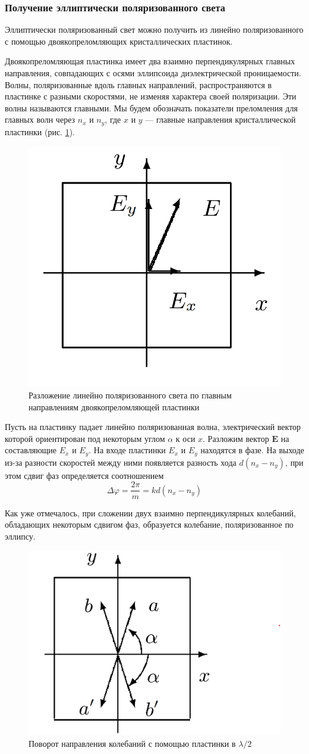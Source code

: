 \subsubsection{Получение эллиптически поляризованного света}

Эллиптически поляризованный свет можно получить из линейно поляризованного с
помощью двоякопреломляющих кристаллических пластинок.

Двоякопреломляющая пластинка имеет два взаимно перпендикулярных главных направления, совпадающих с осями эллипсоида диэлектрической проницаемости. Волны, поляризованные вдоль главных направлений, распространяются в пластинке с разными скоростями, не изменяя характера своей поляризации. Эти волны называются главными. Мы будем обозначать показатели преломления для главных волн через $ n_x $ и $ n_y $, где $ x $ и $ y $ --- главные направления кристаллической пластинки (рис. \ref{pic_1}).
\begin{figure}[!hb]
	\centering
	\includegraphics[width=0.3\linewidth]{pics/pic_1.png}
	\caption{{ Разложение линейно поляризованного света по главным направлениям двоякопреломляющей пластинки}}
	\label{pic_1}
\end{figure}

Пусть на пластинку падает линейно поляризованная волна, электрический вектор которой ориентирован под некоторым углом $\alpha$ к оси
$x$. Разложим вектор $\mathbf{E}$ на составляющие $E_x$ и $E_y$. На входе пластинки $E_x$ и $E_y$ находятся в фазе. На выходе из-за разности скоростей между ними появляется разность хода $d(n_x - n_y)$, при этом сдвиг фаз определяется соотношением
\begin{equation}\label{PathDiff}
\Delta \varphi =  \dfrac{2\pi}{m} = k d(n_x - n_y)
\end{equation}

Как уже отмечалось, при сложении двух взаимно перпендикулярных колебаний, обладающих некоторым сдвигом фаз, образуется колебание, поляризованное по эллипсу.

\begin{figure}[!hb]
	\centering
	\includegraphics[width=0.35\linewidth]{pics/pic_2.png}
	\caption{{Поворот направления колебаний с помощью пластинки в $\lambda/2$}}
	\label{pic_2}
\end{figure}

